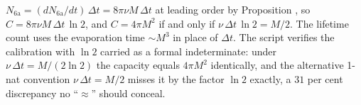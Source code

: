 $N_{\mathrm{6a}} = (dN_{\mathrm{6a}}/dt)\,\Delta t = 8\pi\nu M\,\Delta t$ at leading order by Proposition , so $C = 8\pi\nu M\,\Delta t\,\ln 2$, and $C = 4\pi M^{2}$ if and only if $\nu\,\Delta t\,\ln 2 = M/2$. The lifetime count uses the evaporation time $\sim M^{3}$ in place of $\Delta t$. The script verifies the calibration with $\ln 2$ carried as a formal indeterminate: under $\nu\,\Delta t = M/(2\ln 2)$ the capacity equals $4\pi M^{2}$ identically, and the alternative 1-nat convention $\nu\,\Delta t = M/2$ misses it by the factor $\ln 2$ exactly, a $31$ per cent discrepancy no ``$\approx$'' should conceal.
